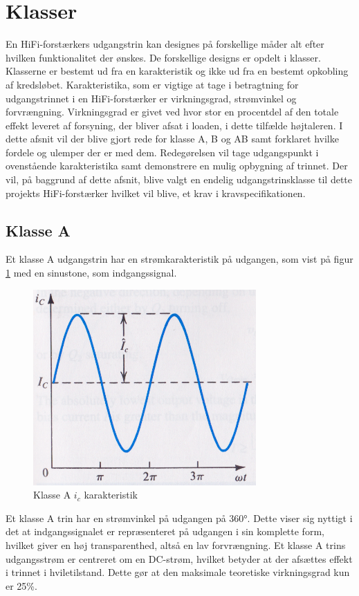 \section{Klasser}
\label{klasser}
En HiFi-forstærkers udgangstrin kan designes på forskellige måder alt efter hvilken funktionalitet der ønskes. De forskellige designs er opdelt i klasser. Klasserne er bestemt ud fra en karakteristik og ikke ud fra en bestemt opkobling af kredsløbet. Karakteristika, som er vigtige at tage i betragtning for udgangstrinnet i en HiFi-forstærker er virkningsgrad, strømvinkel og forvrængning. Virkningsgrad er givet ved hvor stor en procentdel af den totale effekt leveret af forsyning, der bliver afsat i loaden, i dette tilfælde højtaleren.
I dette afsnit vil der blive gjort rede for klasse A, B og AB samt forklaret hvilke fordele og ulemper der er med dem. Redegørelsen vil tage udgangspunkt i ovenstående karakteristika samt demonstrere en mulig opbygning af trinnet.
Der vil, på baggrund af dette afsnit, blive valgt en endelig udgangstrinsklasse til dette projekts HiFi-forstærker hvilket vil blive, et krav i kravspecifikationen.

\subsection{Klasse A}

Et klasse A udgangstrin har en strømkarakteristik på udgangen, som vist på figur \ref{fig:klassea} med en sinustone, som indgangssignal. 

\begin{figure}[h]
\centering
\includegraphics[scale=.35]{indledende_analyse/klasser/klassea.png}
\caption{Klasse A $i_c$ karakteristik}
\label{fig:klassea}
\end{figure}

Et klasse A trin har en strømvinkel på udgangen på 360°. Dette viser sig nyttigt i det at indgangssignalet er repræsenteret på udgangen i sin komplette form, hvilket giver en høj transparenthed, altså en lav forvrængning.
Et klasse A trins udgangsstrøm er centreret om en DC-strøm, hvilket betyder at der afsættes effekt i trinnet i hviletilstand. Dette gør at den maksimale teoretiske virkningsgrad kun er 25\%.

